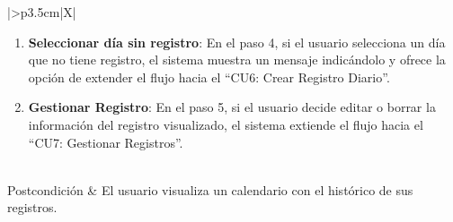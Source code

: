 \begin{xltabular}{\textwidth}{|>{\bfseries}p{3.5cm}|X|}
\begin{enumerate}[leftmargin=0.5cm, topsep=0pt, partopsep=0pt, parsep=0pt, itemsep=4pt]
        \item \textbf{Seleccionar día sin registro}: En el paso 4, si el usuario selecciona un día que no tiene registro, el sistema muestra un mensaje indicándolo y ofrece la opción de extender el flujo hacia el ``CU6: Crear Registro Diario''.
        \item \textbf{Gestionar Registro}: En el paso 5, si el usuario decide editar o borrar la información del registro visualizado, el sistema extiende el flujo hacia el ``CU7: Gestionar Registros''.
    \end{enumerate}
    \\ \hline
    Postcondición & El usuario visualiza un calendario con el histórico de sus registros. \\ \hline
    
    \caption{CU10: Visualizar Historial}
    \label{tab:esp_cu10} \\
\end{xltabular}
\endgroup

